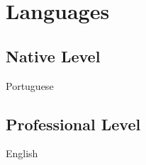 \documentclass[]{deedy-resume-openfont}
\begin{document}
\begin{minipage}[t]{0.33\textwidth}
\section{Languages}
\subsection{Native Level}
Portuguese \\
\subsection{Professional Level}
English
%
%

\end{minipage}
\hfill
\begin{minipage}[t]{0.66\textwidth}


\end{minipage}
\end{document}
